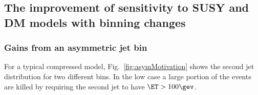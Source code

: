 \subsection{The improvement of sensitivity to SUSY and DM models with binning changes}

\subsubsection{Gains from an asymmetric jet bin}\label{sec:asym_bin}

For a typical compressed model, Fig.~\ref{fig:asymMotivation} shows the second jet \PT
distribution for two different \HT bins. In the low \HT case a large portion of
the events are killed by requiring the second jet to have $\ET>100\gev$. 

